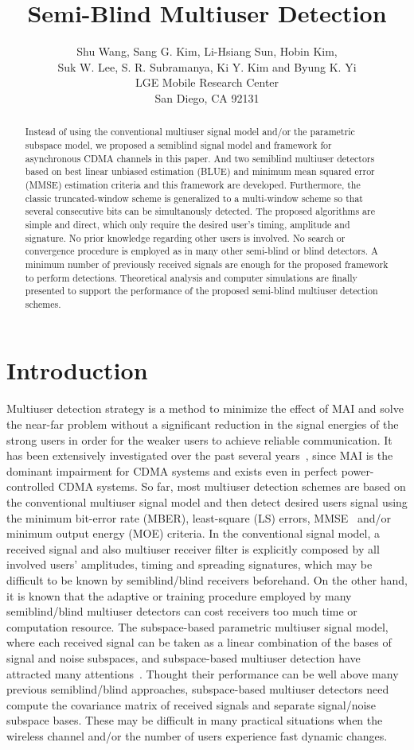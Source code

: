 \documentclass[a4paper,10pt,fleqn, twocolumn]{IEEETran}
\title{ Semi-Blind Multiuser Detection }
\date{}
\author{Shu Wang, Sang G. Kim, Li-Hsiang Sun, Hobin Kim,\\
   Suk W. Lee, S. R. Subramanya, Ki Y. Kim and Byung K. Yi\\LGE Mobile Research Center\\San Diego, CA 92131}
\begin{document}
\maketitle

\begin{abstract}
Instead of using the conventional multiuser signal model and/or
the parametric subspace model, we proposed a semiblind signal
model and framework for asynchronous CDMA channels in this paper.
And two semiblind multiuser detectors based on best linear
unbiased estimation (BLUE) and minimum mean squared error (MMSE)
estimation criteria and this framework are developed. Furthermore,
the classic truncated-window scheme is generalized to a
multi-window scheme so that several consecutive bits can be
simultanously detected. The proposed algorithms are simple and
direct, which only require the desired user's timing, amplitude
and signature. No prior knowledge regarding other users is
involved. No search or convergence procedure is employed as in
many other semi-blind or blind detectors. A minimum number of
previously received signals are enough for the proposed framework
to perform detections. Theoretical analysis and computer
simulations are finally presented to support the performance of
the proposed semi-blind multiuser detection schemes.
\end{abstract}

\section{Introduction}
Multiuser detection strategy is a method to minimize the effect of
MAI and solve the near-far problem without a significant reduction
in the signal energies of the strong users in order for the weaker
users to achieve reliable communication. It has been extensively
investigated over the past several years~\cite{Verd98}, since MAI
is the dominant impairment for CDMA systems and exists even in
perfect power-controlled CDMA systems. So far, most multiuser
detection schemes are based on the conventional multiuser signal
model and then detect desired users signal using the minimum
bit-error rate (MBER), least-square (LS) errors,
MMSE~\cite{Lupa89} and/or minimum output energy (MOE) criteria. In
the conventional signal model, a received signal and also
multiuser receiver filter is explicitly composed by all involved
users' amplitudes, timing and spreading signatures, which may be
difficult to be known by semiblind/blind receivers beforehand. On
the other hand, it is known that the adaptive or training
procedure employed by many semiblind/blind multiuser detectors can
cost receivers too much time or computation resource. The
subspace-based parametric multiuser signal model, where each
received signal can be taken as a linear combination of the bases
of signal and noise subspaces, and subspace-based multiuser
detection have attracted many attentions~\cite{Wang98}. Thought
their performance can be well above many previous semiblind/blind
approaches, subspace-based multiuser detectors need compute the
covariance matrix of received signals and separate signal/noise
subspace bases. These may be difficult in many practical
situations when the wireless channel and/or the number of users
experience fast dynamic changes.
\end{document}
